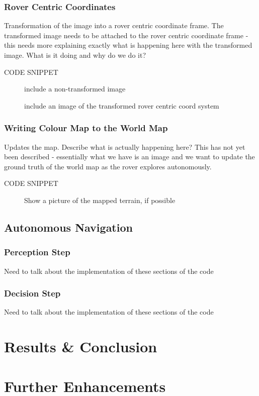 \documentclass[a4paper]{article}
\begin{document}
\subsubsection{Rover Centric Coordinates}
Transformation of the image into a rover centric coordinate frame. The transformed image needs to be attached to the rover centric coordinate frame - this needs more explaining exactly what is happening here with the transformed image. What is it doing and why do we do it?

CODE SNIPPET

\begin{figure}
\begin{minipage}{0.45\linewidth}
\centering
\caption{include a non-transformed image}
\end{minipage}
\begin{minipage}{0.45\linewidth}
\centering
\caption{include an image of the transformed rover centric coord system}
\end{minipage}
\end{figure}

\subsubsection{Writing Colour Map to the World Map}

Updates the map. Describe what is actually happening here? This has not yet been described - essentially what we have is an image and we want to update the ground truth of the world map as the rover explores autonomously.

CODE SNIPPET

\begin{figure}
\centering
\caption{Show a picture of the mapped terrain, if possible}
\end{figure}

\subsection{Autonomous Navigation}
\subsubsection{Perception Step}
Need to talk about the implementation of these sections of the code

\subsubsection{Decision Step}
Need to talk about the implementation of these sections of the code

\section{Results \& Conclusion}

\section{Further Enhancements}
\end{document}
